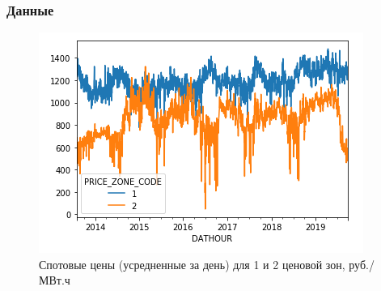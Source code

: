 \documentclass[c, dvipsnames]{beamer}  %
\begin{document}
%
%
%
%
%
%
%
%
%

%
%
%
%
%
%
%
%

%
%
%	
%
%
%
%





\begin{frame}[shrink=5]
\frametitle{Данные } 

\begin{figure}
	\centering
	\includegraphics[width=0.7\linewidth]{screenshot009}
	\caption{Спотовые цены (усредненные за день) для 1 и 2 ценовой зон, руб./МВт.ч}
	\label{fig:screenshot009}
\end{figure}


\end{frame}
\end{document}

